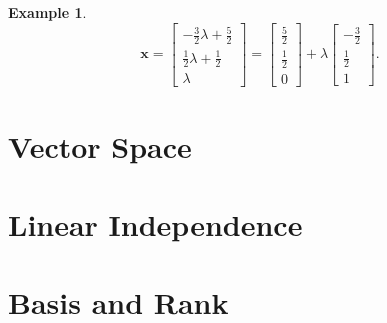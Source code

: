 \documentclass[12pt,openany]{book}
\theoremstyle{definition}
\newtheorem{example}{Example}[chapter]
\begin{document}
\begin{example}
\[		\textbf{x}=\begin{bmatrix}
			-\frac{3}{2}\lambda+\frac{5}{2}\\ \frac{1}{2}\lambda+\frac{1}{2}\\ \lambda
		\end{bmatrix}=\begin{bmatrix}
		\frac{5}{2}\\ \frac{1}{2}\\ 0
		\end{bmatrix}+\lambda\begin{bmatrix}
			-\frac{3}{2}\\ \frac{1}{2}\\ 1
		\end{bmatrix}.
		\]
	\end{example}

	\newpage
	\section{Vector Space}
	\section{Linear Independence}
	\section{Basis and Rank}
	
	\newpage
\end{document}
